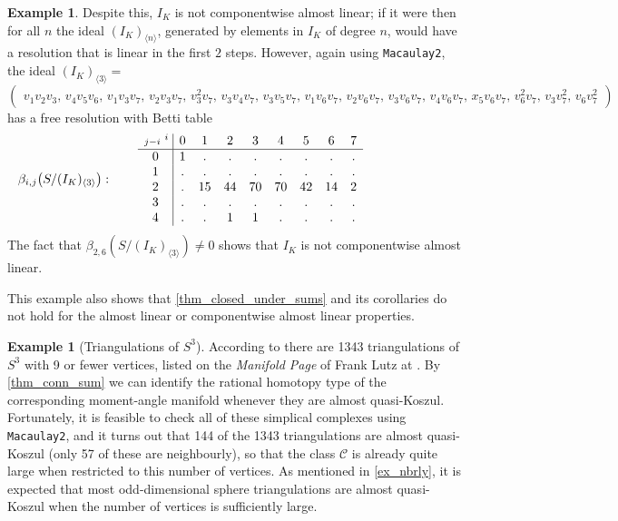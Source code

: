 \documentclass[a4paper,10pt]{amsart}
\theoremstyle{definition}
\newtheorem{example}[theorem]{Example}
\theoremstyle{remark}
\begin{document}
\begin{example}
        Despite this, $I_K$ is not componentwise almost linear; if it were then for all $n$ the ideal $(I_K)_{\langle n\rangle}$, generated by elements in $I_K$ of degree $n$, would have a resolution that is linear in the first $2$ steps. However, again using {\tt Macaulay2}, the ideal $(I_K)_{\langle 3\rangle}=$
          \[
          \left(\begin{smallmatrix}
        v_{1}v_{2}v_{3},\,v_{4}v_{5}v_{6},\,v_{1}v_{3}v_{7},\,v_{2}v_{3}v_{7},\,v_{3}^{2}v_{7},\,v_{3}v_{4}v_{7},\,v_{3}v_{5}v_{7},\,v_{1}v_{6}v_{7},\,v_{2}v_{6}v_{7},\,v_{3}v_{6}v_{7},\,v_{4}v_{6}v_{7},\,x_{5}v_{6}v_{7},\,v_{6}^{2}v_{7},\,v_{3}v_{7}^{2},\,v_{6}v_{7}^{2}\end{smallmatrix}\right)
          \]
        has a free resolution with Betti table
\[             \beta_{i,j}\big(S/(I_K)_{\langle 3\rangle}\big):\qquad \begin{array}{c|c c c c c c c c}
    { \scriptstyle j-i}^{\ i}\! & 0 & 1 & 2 & 3 & 4 & 5 & 6 & 7\\ \hline 
        0& 1 & . & . & . & . & . & . & .\\
        1 & . & . & . & . & . & . & . & .\\
        2 & . & 15 & 44 & 70 & 70 & 42 & 14 & 2\\
        3 & . & . & . & . & . & . & . & .\\
        4 & . & . & 1 & 1 & . & . & . & .
        \end{array}
        \hspace{25mm}
        \]
The fact that $\beta_{2,6}(S/(I_K)_{\langle 3\rangle})\neq 0$ shows that $I_K$ is not componentwise almost linear.

This example also shows that \cref{thm_closed_under_sums} and its corollaries do not hold for the almost linear or componentwise almost linear properties.
\end{example}

\begin{example}[Triangulations of $S^3$]
According to \cite{LUTZ} there are 1343 triangulations of $S^3$ with 9 or fewer vertices, listed on the \emph{Manifold Page} of Frank Lutz at \cite{ManifoldPage}. By \cref{thm_conn_sum} we can identify the rational homotopy type of the corresponding moment-angle manifold whenever they are almost quasi-Koszul. Fortunately, it is feasible to check all of these simplical complexes using {\tt Macaulay2}, and it turns out that 144 of the 1343 triangulations are almost quasi-Koszul (only 57 of these are neighbourly), so that the class $\mathcal{C}$ is already quite large when restricted to this number of vertices. As mentioned in \cref{ex_nbrly}, it is expected that most odd-dimensional sphere triangulations are almost quasi-Koszul when the number of vertices is sufficiently large.
\end{example}
\end{document}
